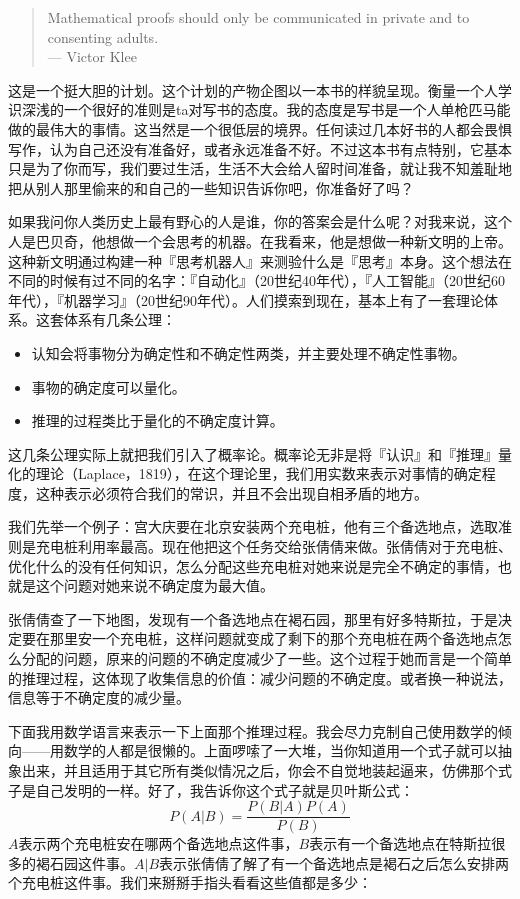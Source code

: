 \documentclass[oneside,11pt]{memoir} %
\begin{document}
\begin{quote}
Mathematical proofs should only be communicated in private and to consenting adults.\\
\hfill --- Victor Klee
\end{quote}
这是一个挺大胆的计划。这个计划的产物企图以一本书的样貌呈现。衡量一个人学识深浅的一个很好的准则是ta对写书的态度。我的态度是写书是一个人单枪匹马能做的最伟大的事情。这当然是一个很低层的境界。任何读过几本好书的人都会畏惧写作，认为自己还没有准备好，或者永远准备不好。不过这本书有点特别，它基本只是为了你而写，我们要过生活，生活不大会给人留时间准备，就让我不知羞耻地把从别人那里偷来的和自己的一些知识告诉你吧，你准备好了吗？

如果我问你人类历史上最有野心的人是谁，你的答案会是什么呢？对我来说，这个人是巴贝奇，他想做一个会思考的机器。在我看来，他是想做一种新文明的上帝。这种新文明通过构建一种『思考机器人』来测验什么是『思考』本身。这个想法在不同的时候有过不同的名字：『自动化』（20世纪40年代），『人工智能』（20世纪60年代），『机器学习』（20世纪90年代）。人们摸索到现在，基本上有了一套理论体系。这套体系有几条公理：
\begin{itemize}
\item 认知会将事物分为确定性和不确定性两类，并主要处理不确定性事物。
\item 事物的确定度可以量化。
\item 推理的过程类比于量化的不确定度计算。
\end{itemize}
这几条公理实际上就把我们引入了概率论。概率论无非是将『认识』和『推理』量化的理论（Laplace，1819），在这个理论里，我们用实数来表示对事情的确定程度，这种表示必须符合我们的常识，并且不会出现自相矛盾的地方。 

我们先举一个例子：宫大庆要在北京安装两个充电桩，他有三个备选地点，选取准则是充电桩利用率最高。现在他把这个任务交给张倩倩来做。张倩倩对于充电桩、优化什么的没有任何知识，怎么分配这些充电桩对她来说是完全不确定的事情，也就是这个问题对她来说不确定度为最大值。

张倩倩查了一下地图，发现有一个备选地点在褐石园，那里有好多特斯拉，于是决定要在那里安一个充电桩，这样问题就变成了剩下的那个充电桩在两个备选地点怎么分配的问题，原来的问题的不确定度减少了一些。这个过程于她而言是一个简单的推理过程，这体现了收集信息的价值：减少问题的不确定度。或者换一种说法，信息等于不确定度的减少量。

下面我用数学语言来表示一下上面那个推理过程。我会尽力克制自己使用数学的倾向——用数学的人都是很懒的。上面啰嗦了一大堆，当你知道用一个式子就可以抽象出来，并且适用于其它所有类似情况之后，你会不自觉地装起逼来，仿佛那个式子是自己发明的一样。好了，我告诉你这个式子就是贝叶斯公式：
\begin{equation}
P(A|B)=\frac{P(B|A)P(A)}{P(B)}
\end{equation}
$A$表示两个充电桩安在哪两个备选地点这件事，$B$表示有一个备选地点在特斯拉很多的褐石园这件事。$A|B$表示张倩倩了解了有一个备选地点是褐石之后怎么安排两个充电桩这件事。我们来掰掰手指头看看这些值都是多少：
\end{document}
